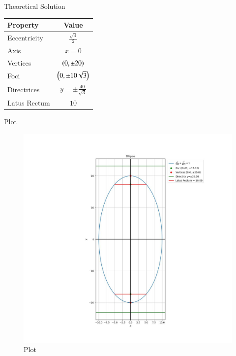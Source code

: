 \documentclass{beamer}
\begin{document}
\begin{frame}{Theoretical Solution}
\begin{center}
\begin{tabular}{|l|c|}
    \hline
    \textbf{Property} & \textbf{Value} \\
    \hline
    Eccentricity & $\frac{\sqrt{3}}{2}$ \\
    \hline
    Axis & $x=0$ \\
    \hline
    Vertices & $\left(0, \pm 20\right)$ \\
    \hline
    Foci & $\left(0, \pm 10\sqrt{3}\right)$ \\
    \hline
    Directrices & $y = \pm \frac{40}{\sqrt{3}}$ \\
    \hline
    Latus Rectum & $10$ \\
    \hline
\end{tabular}
\end{center}
\end{frame}

\begin{frame}{Plot}
\begin{figure}
	\centering
	\includegraphics[width=0.5\columnwidth]{../figs/plot_c.jpg}
	\caption{Plot}
	\label{fig:fig}
\end{figure}
\end{frame}
\end{document}
